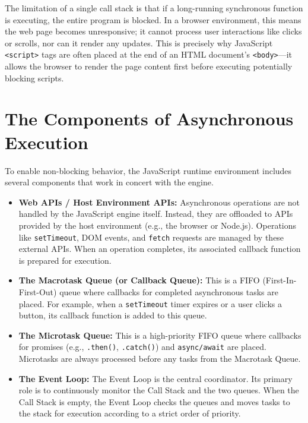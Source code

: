 \documentclass{scrbook}
\begin{document}
The limitation of a single call stack is that if a long-running synchronous function is executing, the entire program is blocked. In a browser environment, this means the web page becomes unresponsive; it cannot process user interactions like clicks or scrolls, nor can it render any updates. This is precisely why JavaScript \texttt{<script>} tags are often placed at the end of an HTML document's \texttt{<body>}—it allows the browser to render the page content first before executing potentially blocking scripts.

\section{The Components of Asynchronous Execution}

To enable non-blocking behavior, the JavaScript runtime environment includes several components that work in concert with the engine.

\begin{itemize}
    \item
    \textbf{Web APIs / Host Environment APIs:} Asynchronous operations are not handled by the JavaScript engine itself. Instead, they are offloaded to APIs provided by the host environment (e.g., the browser or Node.js). Operations like \texttt{setTimeout}, DOM events, and \texttt{fetch} requests are managed by these external APIs. When an operation completes, its associated callback function is prepared for execution.
    
    \item
    \textbf{The Macrotask Queue (or Callback Queue):} This is a FIFO (First-In-First-Out) queue where callbacks for completed asynchronous tasks are placed. For example, when a \texttt{setTimeout} timer expires or a user clicks a button, its callback function is added to this queue.
    
    \item
    \textbf{The Microtask Queue:} This is a high-priority FIFO queue where callbacks for promises (e.g., \texttt{.then()}, \texttt{.catch()}) and \texttt{async/await} are placed. Microtasks are always processed before any tasks from the Macrotask Queue.
    
    \item
    \textbf{The Event Loop:} The Event Loop is the central coordinator. Its primary role is to continuously monitor the Call Stack and the two queues. When the Call Stack is empty, the Event Loop checks the queues and moves tasks to the stack for execution according to a strict order of priority.
\end{itemize}
\end{document}
